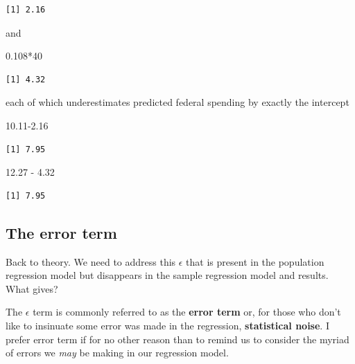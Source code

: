 \documentclass[
]{book}
\makeatletter
\newenvironment{Shaded}{\begin{snugshade}}{\end{snugshade}}
\newcommand{\DecValTok}[1]{\textcolor[rgb]{0.06,0.06,0.06}{#1}}
\newcommand{\FloatTok}[1]{\textcolor[rgb]{0.06,0.06,0.06}{#1}}
\newcommand{\SpecialCharTok}[1]{\textcolor[rgb]{0,0,0}{#1}}
\newenvironment{kframe}{%
\medskip{}
\setlength{\fboxsep}{.8em}
 \def\at@end@of@kframe{}%
 \ifinner\ifhmode%
  \def\at@end@of@kframe{\end{minipage}}%
  \begin{minipage}{\columnwidth}%
 \fi\fi%
 \def\FrameCommand##1{\hskip\@totalleftmargin \hskip-\fboxsep
 \colorbox{shadecolor}{##1}\hskip-\fboxsep
     \hskip-\linewidth \hskip-\@totalleftmargin \hskip\columnwidth}%
 \MakeFramed {\advance\hsize-\width
   \@totalleftmargin\z@ \linewidth\hsize
   \@setminipage}}%
 {\par\unskip\endMakeFramed%
 \at@end@of@kframe}
\renewenvironment{Shaded}{\begin{kframe}}{\end{kframe}}
\makeatother
\begin{document}
\begin{verbatim}
[1] 2.16
\end{verbatim}

and

\begin{Shaded}
\begin{Highlighting}[]
\FloatTok{0.108}\SpecialCharTok{*}\DecValTok{40}
\end{Highlighting}
\end{Shaded}

\begin{verbatim}
[1] 4.32
\end{verbatim}

each of which underestimates predicted federal spending by exactly the intercept

\begin{Shaded}
\begin{Highlighting}[]
\FloatTok{10.11{-}2.16}
\end{Highlighting}
\end{Shaded}

\begin{verbatim}
[1] 7.95
\end{verbatim}

\begin{Shaded}
\begin{Highlighting}[]
\FloatTok{12.27} \SpecialCharTok{{-}} \FloatTok{4.32}
\end{Highlighting}
\end{Shaded}

\begin{verbatim}
[1] 7.95
\end{verbatim}

\hypertarget{the-error-term}{%
\subsection{The error term}\label{the-error-term}}

Back to theory. We need to address this \(\epsilon\) that is present in the population regression model but disappears in the sample regression model and results. What gives?

The \(\epsilon\) term is commonly referred to as the \textbf{error term} or, for those who don't like to insinuate some error was made in the regression, \textbf{statistical noise}. I prefer error term if for no other reason than to remind us to consider the myriad of errors we \emph{may} be making in our regression model.
\end{document}
